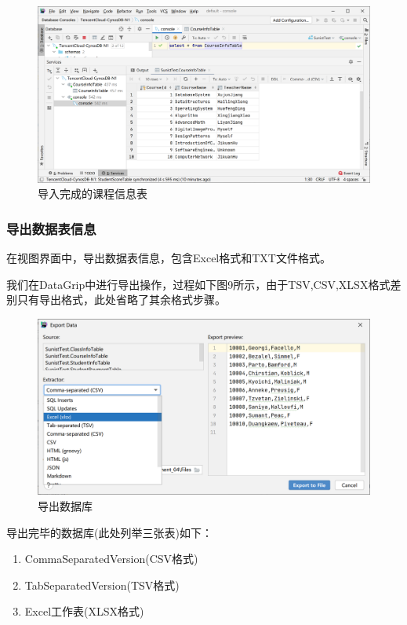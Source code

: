 \documentclass[a4paper,UTF8,heading=false,12pt]{article}
\begin{document}
\begin{figure}[htbp]
    \centering
    \includegraphics[width=14cm]{../Images/CourseInfoTable_OnImported.png}
    \caption{导入完成的课程信息表}
\end{figure}

\newpage

\subsubsection{导出数据表信息}

在视图界面中，导出数据表信息，包含Excel格式和TXT文件格式。

我们在DataGrip中进行导出操作，过程如下图9所示，由于TSV,CSV,XLSX格式差别只有导出格式，此处省略了其余格式步骤。

\begin{figure}[htbp]
    \centering
    \includegraphics[width=15cm]{../Images/Database_OnExport.png}
    \caption{导出数据库}
\end{figure}

导出完毕的数据库(此处列举三张表)如下：

\begin{enumerate}
    \item CommaSeparatedVersion(CSV格式)
    \item TabSeparatedVersion(TSV格式)
    \item Excel工作表(XLSX格式)
\end{enumerate}
\end{document}

